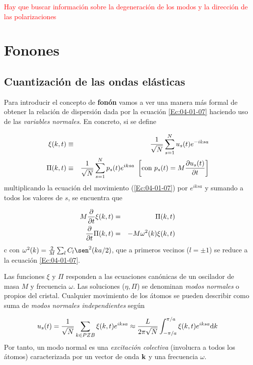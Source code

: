 \begin{Anotacion}
	\textcolor{red}{Hay que buscar información sobre la degeneración de los modos y la dirección de las polarizaciones}	
\end{Anotacion}

\section{Fonones}

\subsection{Cuantización de las ondas elásticas}

Para introducir el concepto de \textbf{fonón} vamos a ver una manera más formal de obtener la relación de dispersión dada por la ecuación \ref{Ec:04-01-07} haciendo uso de las \textit{variables normales}. En concreto, si se define 

\begin{eqnarray}
    \xi (k,t) & \equiv & \frac{1}{\sqrt{N}} \sum_{s=1}^N u_s (t) e^{-iksa} \\
    \Pi (k,t) & \equiv & \frac{1}{\sqrt{N}} \sum_{s=1}^N p_s (t) e^{iksa} \ \left[ \text{con} \ p_s (t) = M \frac{\partial u_s(t)}{\partial t} \right]
\end{eqnarray}
multiplicando la ecuación del movimiento (\ref{Ec:04-01-07}) por $e^{iksa}$ y sumando a todos los valores de $s$, se encuentra que

\begin{eqnarray}
    M \frac{\partial }{\partial t} \xi (k,t) & = & \Pi (k,t) \\
    \frac{\partial }{\partial t} \Pi (k,t) & =  & - M \omega^2 (k) \xi (k,t)    
\end{eqnarray}c
con $\omega^2 (k) = \frac{2}{M} \sum_l C_l \sen^2 ( ka/2)$, que a primeros vecinos ($l=\pm 1$) se reduce a la ecuación \ref{Ec:04-01-07}.

Las funciones $\xi$ y $\Pi$ responden a las ecuaciones canónicas de un oscilador de masa $M$ y frecuencia $\omega$. Las soluciones ($\eta,\Pi$) se denominan \textit{modos normales} o propios del cristal. Cualquier movimiento de los átomos se pueden describir como suma de \textit{modos normales independientes} según

\begin{equation}
    u_s (t) = \frac{1}{\sqrt{N}} \sum_{k \in PZB} \xi (k,t) e^{iksa} \approx \frac{L}{2\pi \sqrt{N}} \int_{-\pi/a}^{\pi/a} \xi (k,t) e^{iksa} \mathrm{d} k
\end{equation}
Por tanto, un modo normal es una \textit{excitación colectiva} (involucra a todos los átomos) caracterizada por un vector de onda $\mathbf{k}$ y una frecuencia $\omega$. 

